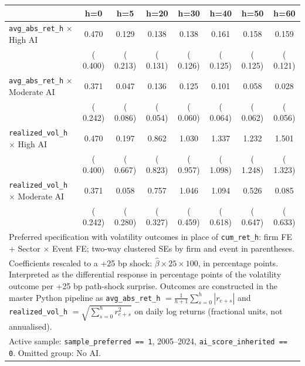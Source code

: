 \begin{tabular}{lccccccc}\hline\hline
 & h=0 & h=5 & h=20 & h=30 & h=40 & h=50 & h=60 \\
\hline
\texttt{avg\_abs\_ret\_h} $\times$ High AI &  0.470 &  0.129 &  0.138 &  0.138 &  0.161 &  0.158 &  0.159 \\
 & ( 0.400) & ( 0.213) & ( 0.131) & ( 0.126) & ( 0.125) & ( 0.125) & ( 0.121) \\
\texttt{avg\_abs\_ret\_h} $\times$ Moderate AI &  0.371 &  0.047 &  0.136 &  0.125 &  0.101 &  0.058 &  0.028 \\
 & ( 0.242) & ( 0.086) & ( 0.054) & ( 0.060) & ( 0.064) & ( 0.062) & ( 0.056) \\
\hline
\texttt{realized\_vol\_h} $\times$ High AI &  0.470 &  0.197 &  0.862 &  1.030 &  1.337 &  1.232 &  1.501 \\
 & ( 0.400) & ( 0.667) & ( 0.823) & ( 0.957) & ( 1.098) & ( 1.248) & ( 1.323) \\
\texttt{realized\_vol\_h} $\times$ Moderate AI &  0.371 &  0.058 &  0.757 &  1.046 &  1.094 &  0.526 &  0.085 \\
 & ( 0.242) & ( 0.280) & ( 0.327) & ( 0.459) & ( 0.618) & ( 0.647) & ( 0.633) \\
\hline\hline
\multicolumn{8}{l}{\footnotesize Preferred specification with volatility outcomes in place of \texttt{cum\_ret\_h}: firm FE + Sector $\times$ Event FE; two-way clustered SEs by firm and event in parentheses.} \\
\multicolumn{8}{l}{\footnotesize Coefficients rescaled to a +25 bp shock: $\hat\beta \times 25 \times 100$, in percentage points. Interpreted as the differential response in percentage points of the volatility outcome per +25 bp path-shock surprise. Outcomes are constructed in the master Python pipeline as \texttt{avg\_abs\_ret\_h} $= \tfrac{1}{h+1}\sum_{s=0}^{h}|r_{e+s}|$ and \texttt{realized\_vol\_h} $= \sqrt{\sum_{s=0}^{h} r_{e+s}^{2}}$ on daily log returns (fractional units, not annualised).} \\
\multicolumn{8}{l}{\footnotesize Active sample: \texttt{sample\_preferred == 1}, 2005--2024, \texttt{ai\_score\_inherited == 0}. Omitted group: No AI.} \\
\end{tabular}
